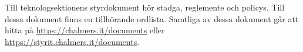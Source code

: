 Till teknologsektionens styrdokument hör stadga, reglemente och policys. Till dessa dokument finns en tillhörande ordlista. Samtliga av dessa dokument går att hitta på \url{https://chalmers.it/documents} eller \url{https://styrit.chalmers.it/documents}. 